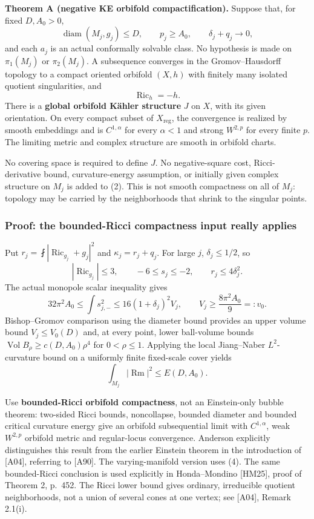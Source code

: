 \documentclass[
  11pt,
]{article}
\begin{document}
\textbf{Theorem A (negative KE orbifold compactification).} Suppose
that, for fixed \(D,A_0>0\), \[
 \operatorname{diam}(M_j,g_j)\le D,\qquad p_j\ge A_0,
 \qquad \delta_j+q_j\longrightarrow0,                 \tag{2}
\] and each \(a_j\) is an actual conformally solvable class. No
hypothesis is made on \(\pi_1(M_j)\) or \(\pi_2(M_j)\). A subsequence
converges in the Gromov--Hausdorff topology to a compact oriented
orbifold \((X,h)\) with finitely many isolated quotient singularities,
and \[
              \operatorname{Ric}_h=-h.
\] There is a \textbf{global orbifold Kähler structure} \(J\) on \(X\),
with its given orientation. On every compact subset of
\(X_{\mathrm{reg}}\), the convergence is realized by smooth embeddings
and is \(C^{1,\alpha}\) for every \(\alpha<1\) and strong \(W^{2,p}\)
for every finite \(p\). The limiting metric and complex structure are
smooth in orbifold charts.

No covering space is required to define \(J\). No negative-square cost,
Ricci-derivative bound, curvature-energy assumption, or initially given
complex structure on \(M_j\) is added to (2). This is not smooth
compactness on all of \(M_j\): topology may be carried by the
neighborhoods that shrink to the singular points.

\hypertarget{proof-the-bounded-ricci-compactness-input-really-applies}{%
\subsubsection{Proof: the bounded-Ricci compactness input really
applies}\label{proof-the-bounded-ricci-compactness-input-really-applies}}

Put \(r_j=\fint|\operatorname{Ric}_{g_j}+g_j|^2\) and
\(\kappa_j=r_j+q_j\). For large \(j\), \(\delta_j\le1/2\), so \[
 |\operatorname{Ric}_{g_j}|\le3,\qquad
 -6\le s_j\le-2,\qquad r_j\le4\delta_j^2.
\] The actual monopole scalar inequality gives \[
 32\pi^2A_0\le\int s_{j,-}^2
       \le16(1+\delta_j)^2V_j,\qquad
 V_j\ge\frac{8\pi^2A_0}{9}=:v_0.                     \tag{3}
\] Bishop--Gromov comparison using the diameter bound provides an upper
volume bound \(V_j\le V_0(D)\) and, at every point, lower ball-volume
bounds \(\operatorname{Vol}B_\rho\ge c(D,A_0)\rho^4\) for
\(0<\rho\le1\). Applying the local Jiang--Naber \(L^2\)-curvature bound
on a uniformly finite fixed-scale cover yields \[
                    \int_{M_j}|\operatorname{Rm}|^2\le E(D,A_0).
 \tag{4}
\]

Use \textbf{bounded-Ricci orbifold compactness}, not an Einstein-only
bubble theorem: two-sided Ricci bounds, noncollapse, bounded diameter
and bounded critical curvature energy give an orbifold subsequential
limit with \(C^{1,\alpha}\), weak \(W^{2,p}\) orbifold metric and
regular-locus convergence. Anderson explicitly distinguishes this result
from the earlier Einstein theorem in the introduction of {[}A04{]},
referring to {[}A90{]}. The varying-manifold version uses (4). The same
bounded-Ricci conclusion is used explicitly in Honda--Mondino
{[}HM25{]}, proof of Theorem 2, p.~452. The Ricci lower bound gives
ordinary, irreducible quotient neighborhoods, not a union of several
cones at one vertex; see {[}A04{]}, Remark 2.1(i).
\end{document}
